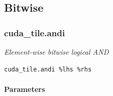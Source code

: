 \documentclass{article}
\begin{document}
\subsection{Bitwise}

\subsubsection{cuda\_tile.andi}

\textit{Element-wise bitwise logical AND}


\begin{lstlisting}
cuda_tile.andi %lhs %rhs
\end{lstlisting}

\paragraph{Parameters}
\end{document}
